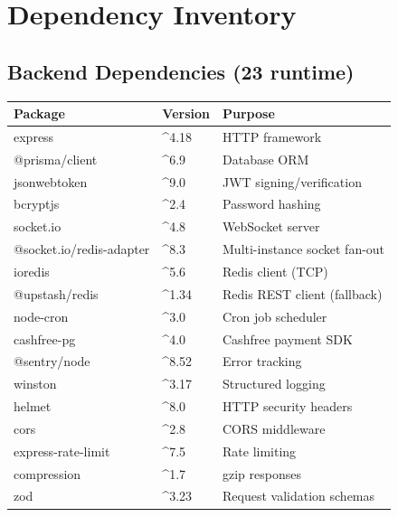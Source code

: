 \documentclass[11pt,a4paper,twoside]{book}
\newcommand{\th}[1]{\textbf{\color{white}#1}}
\begin{document}
\section{Dependency Inventory}

\subsection{Backend Dependencies (23 runtime)}

\begin{center}\footnotesize
\begin{tabular}{p{4.5cm}p{3.5cm}p{4.5cm}}
\toprule
\rowcolor{headbg}\th{Package} & \th{Version} & \th{Purpose} \\
\midrule
express               & \^{}4.18         & HTTP framework \\
\rowcolor{rowalt}@prisma/client        & \^{}6.9          & Database ORM \\
jsonwebtoken          & \^{}9.0          & JWT signing/verification \\
\rowcolor{rowalt}bcryptjs              & \^{}2.4          & Password hashing \\
socket.io             & \^{}4.8          & WebSocket server \\
\rowcolor{rowalt}@socket.io/redis-adapter & \^{}8.3      & Multi-instance socket fan-out \\
ioredis               & \^{}5.6          & Redis client (TCP) \\
\rowcolor{rowalt}@upstash/redis        & \^{}1.34         & Redis REST client (fallback) \\
node-cron             & \^{}3.0          & Cron job scheduler \\
\rowcolor{rowalt}cashfree-pg           & \^{}4.0          & Cashfree payment SDK \\
@sentry/node          & \^{}8.52         & Error tracking \\
\rowcolor{rowalt}winston               & \^{}3.17         & Structured logging \\
helmet                & \^{}8.0          & HTTP security headers \\
\rowcolor{rowalt}cors                  & \^{}2.8          & CORS middleware \\
express-rate-limit    & \^{}7.5          & Rate limiting \\
\rowcolor{rowalt}compression           & \^{}1.7          & gzip responses \\
zod                   & \^{}3.23         & Request validation schemas \\

\end{tabular}
\end{center}
\end{document}
